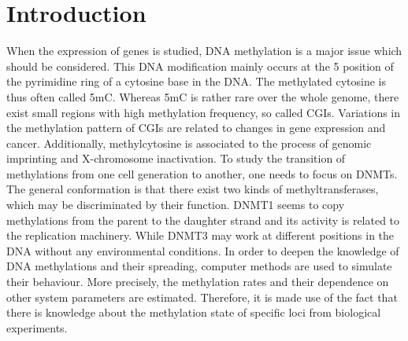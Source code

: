 \pagestyle{headings}
\chapter{Introduction}
\label{chapter:intro}
When the expression of genes is studied, DNA methylation is a major issue which should be considered. This DNA modification mainly occurs at the 5 position of the pyrimidine ring of a cytosine base in the DNA\cite{DNAMethylation}. The methylated cytosine is thus often called \ac{5mC}. Whereas \ac{5mC} is rather rare over the whole genome, there exist small regions with high methylation frequency, so called \acp{CGI}. Variations in the methylation pattern of \acp{CGI} are related to changes in gene expression and cancer\cite{Handbook}. Additionally, methylcytosine  is associated to the process of genomic imprinting and X-chromosome inactivation\cite{Walter}.\newline
To study the transition of methylations from one cell generation to another, one needs to focus on \acfp{DNMT}. The general conformation is that there exist two kinds of methyltransferases, which may be discriminated by their function. DNMT1 seems to copy methylations from the parent to the daughter strand and its activity is related to the replication machinery. While DNMT3 may work at different positions in the DNA without any environmental conditions\cite{DNAMethylation}. In order to deepen the knowledge of DNA methylations and their spreading, computer methods are used to simulate their behaviour. More precisely, the methylation rates and their dependence on other system parameters are estimated. Therefore, it is made use of the fact that there is knowledge about the methylation state of specific loci from biological experiments.\\

